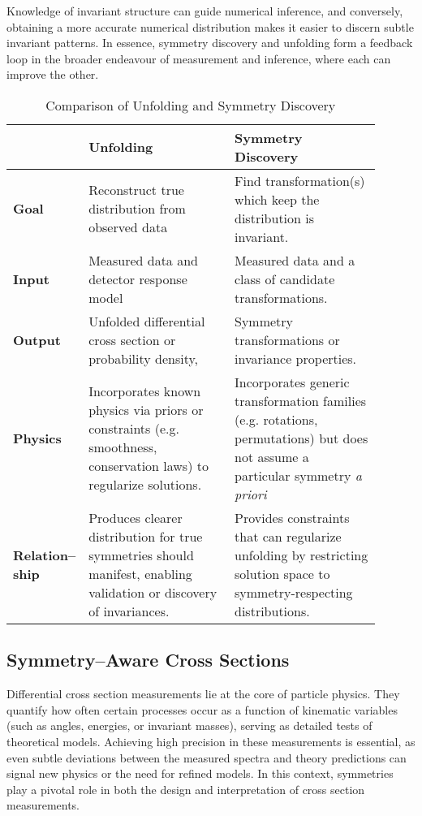         Knowledge of invariant structure can guide numerical inference, and conversely, obtaining a more accurate numerical distribution makes it easier to discern subtle invariant patterns.
        In essence, symmetry discovery and unfolding form a feedback loop in the broader endeavour of measurement and inference, where each can improve the other.
        \begin{table}
            \centering
            \caption{Comparison of Unfolding and Symmetry Discovery}
            \label{tab:unfolding_vs_symmetry}
            \begin{tabular}{m{0.1\linewidth} | m{0.4\linewidth} m{0.4\linewidth} }
                \toprule
                 & \textbf{Unfolding} & \textbf{Symmetry Discovery} \\
                \midrule
                \textbf{Goal} & Reconstruct true distribution from observed data & Find transformation(s) which keep the distribution is invariant. \\
                \midrule
                \textbf{Input} & Measured data and detector response model & Measured data and a class of candidate transformations.\\
                \midrule
                \textbf{Output} & Unfolded differential cross section or probability density,  & Symmetry transformations or invariance properties. \\
                \midrule
                \textbf{Physics} & Incorporates known physics via priors or constraints (e.g. smoothness, conservation laws) to regularize solutions. & Incorporates generic transformation families (e.g. rotations, permutations) but does not assume a particular symmetry \textit{a priori}\\
                \midrule
                \textbf{Relation--ship} & Produces clearer distribution for true symmetries should manifest, enabling validation or discovery of invariances. & Provides constraints that can regularize unfolding by restricting solution space to symmetry-respecting distributions. \\
                \bottomrule
            \end{tabular}
        \end{table}

    \subsection{Symmetry--Aware Cross Sections}
        Differential cross section measurements lie at the core of particle physics.
        They quantify how often certain processes occur as a function of kinematic variables (such as angles, energies, or invariant masses), serving as detailed tests of theoretical models.
        Achieving high precision in these measurements is essential, as even subtle deviations between the measured spectra and theory predictions can signal new physics or the need for refined models.
        In this context, symmetries play a pivotal role in both the design and interpretation of cross section measurements.

